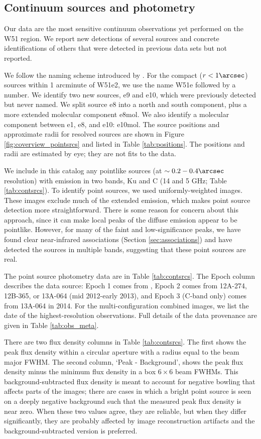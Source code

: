 \subsection{Continuum sources and photometry}
\label{sec:pointsources}
Our data are the most sensitive continuum observations yet performed on the W51
region.  We report new detections of several sources and concrete
identifications of others that were detected in previous data sets but not
reported.

We follow the naming scheme introduced by \citet{Mehringer1994a}.  For the
compact ($r<1\arcsec$) sources within 1 arcminute of W51e2, we use the name
W51e followed by a number.  We identify two new sources, e9  and e10, which
were previously detected but never named.  We split source e8 into a north and
south component, plus a more extended molecular component e8mol.  We also
identify a molecular component between e1, e8, and e10: e10mol.  The source
positions and approximate radii for resolved sources are shown in Figure
\ref{fig:coverview_pointsrcs} and listed in Table \ref{tab:positions}.
The positions and radii are estimated by eye; they are not fits to the data.



We include in this catalog any pointlike sources (at $\sim0.2-0.4\arcsec$
resolution) with emission in two bands, Ku and C (14 and 5 GHz; Table
\ref{tab:contsrcs}).  To identify point sources, we used uniformly-weighted
images.  These images exclude much of the extended emission, which makes point
source detection more straightforward.  There is some reason for concern about
this approach, since it can make local peaks of the diffuse emission appear to
be pointlike.  However, for many of the faint and low-significance peaks, we
have found clear near-infrared associations (Section \ref{sec:associations})
and have detected the sources in multiple bands, suggesting that these point
sources are real.

The point source photometry data are in Table \ref{tab:contsrcs}.  The Epoch column
describes the data source: Epoch 1 comes from \citet{Mehringer1994a}, Epoch 2
comes from 12A-274, 12B-365, or 13A-064 (mid 2012-early
2013), and Epoch 3 (C-band only) comes from
13A-064 in 2014. For the multi-configuration combined images, we list the date
of the highest-resolution observations.  Full details of the data provenance
are given in Table \ref{tab:obs_meta}.

There are two flux density columns in Table \ref{tab:contsrcs}.  The first
shows the peak flux density within a circular aperture with a
radius equal to the beam major FWHM.  The second column, `Peak -
Background', shows the peak flux density minus the minimum flux density in a
box $6\times6$ beam FWHMs.  This background-subtracted flux density is meant to
account for negative bowling that affects parts of the images; there are cases
in which a bright point source is seen on a deeply negative background such
that the measured peak flux density is near zero.  When these two values agree,
they are reliable, but when they differ significantly, they are probably
affected by image reconstruction artifacts and the background-subtracted
version is preferred.

